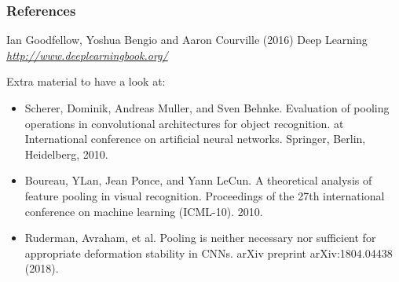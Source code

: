 \begin{vbframe}
\frametitle{References}
\footnotesize{
\begin{thebibliography}{99}
 Ian Goodfellow, Yoshua Bengio and Aaron Courville (2016)
\newblock Deep Learning
\newblock \emph{\url{http://www.deeplearningbook.org/}}
\end{thebibliography}

{Extra material to have a look at:}
    \begin{itemize}
       \item Scherer, Dominik, Andreas Muller, and Sven Behnke. Evaluation of pooling operations in convolutional architectures for object recognition. at International conference on artificial neural networks. Springer, Berlin, Heidelberg, 2010.
       \item Boureau, YLan, Jean Ponce, and Yann LeCun. A theoretical analysis of feature pooling in visual recognition. Proceedings of the 27th international conference on machine learning (ICML-10). 2010.
       \item Ruderman, Avraham, et al. Pooling is neither necessary nor sufficient for appropriate deformation stability in CNNs. arXiv preprint arXiv:1804.04438 (2018).
    \end{itemize}
}
\end{vbframe}
\endlecture
